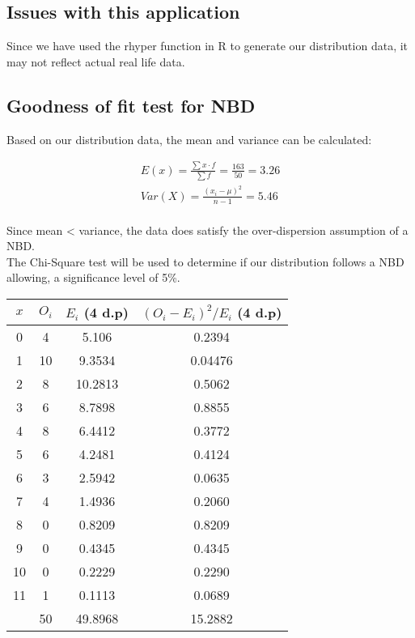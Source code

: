 \documentclass{article}
\begin{document}
\subsection{Issues with this application}
Since we have used the rhyper function in R to generate our distribution
data, it may not reflect actual real life data.

\pagebreak

\subsection{Goodness of fit test for NBD}
Based on our distribution data, the mean and variance can be calculated:

\begin{gather*}
  E(x) = \frac{\sum x \cdot f}{\sum f} = \frac{163}{50} = 3.26 \\[5pt]
  Var(X) = \frac{(x_i - \mu)^2}{n - 1} = 5.46 \\[5pt]
\end{gather*}

Since mean < variance, the data does satisfy the over-dispersion 
assumption of a NBD.\\

The Chi-Square test will be used to determine if our distribution
follows a NBD allowing, a significance level of 5\%.

\begin{center}
  \begin{tabular}{|c|c|c|c|}
    \hline
    $x$ & $O_i$ & $ E_i $ (4 d.p) & $ (O_i - E_i)^2 / E_i $ (4 d.p) \\
    \hline 
    \hline 
    0  & 4  & 5.106   & 0.2394 \\
    1  & 10 & 9.3534  & 0.04476 \\
    2  & 8  & 10.2813 & 0.5062 \\
    3  & 6  & 8.7898  & 0.8855 \\
    4  & 8  & 6.4412  & 0.3772 \\
    5  & 6  & 4.2481  & 0.4124 \\
    6  & 3  & 2.5942  & 0.0635 \\
    7  & 4  & 1.4936  & 0.2060 \\
    8  & 0  & 0.8209  & 0.8209 \\
    9  & 0  & 0.4345  & 0.4345 \\
    10 & 0  & 0.2229  & 0.2290 \\
    11 & 1  & 0.1113  & 0.0689 \\
    \hline
    \hline
       & 50 & 49.8968 & 15.2882  \\
    \hline
  \end{tabular}
\end{center}
\end{document}
